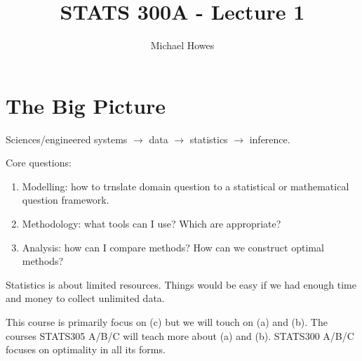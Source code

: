 



\title{STATS 300A - Lecture 1}
\author{Michael Howes}


\maketitle
\section{The Big Picture}
Sciences/engineered systems $\to$ data $\to$ statistics $\to$ inference.

Core questions:
\begin{enumerate}
    \item Modelling: how to trnslate domain question to a statistical or mathematical question framework.
    \item Methodology: what tools can I use? Which are appropriate?
    \item Analysis: how can I compare methods? How can we construct optimal methods?
\end{enumerate}
Statistics is about limited resources. Things would be easy if we had enough time and money to collect unlimited data.

This course is primarily focus on (c) but we will touch on (a) and (b). The courses STATS305 A/B/C will teach more about (a) and (b). STATS300 A/B/C focuses on optimality in all its forms.

